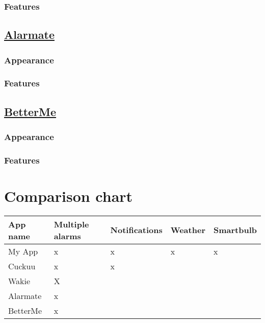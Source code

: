\subsubsection{Features}\label{features-1}

\subsection{\texorpdfstring{\href{http://applits.com/livepages/Alarmate.php}{Alarmate}}{Alarmate}}\label{alarmate}

\subsubsection{Appearance}\label{appearance-2}

\subsubsection{Features}\label{features-2}

\subsection{\texorpdfstring{\href{http://www.bettermeapp.co/}{BetterMe}}{BetterMe}}\label{betterme}

\subsubsection{Appearance}\label{appearance-3}

\subsubsection{Features}\label{features-3}

\section{Comparison chart}\label{comparison-chart}

\begin{longtable}[]{@{}lllll@{}}
\toprule
App name & Multiple alarms & Notifications & Weather &
Smartbulb\tabularnewline
\midrule
\endhead
My App & x & x & x & x\tabularnewline
Cuckuu & x & x & &\tabularnewline
Wakie & X & & &\tabularnewline
Alarmate & x & & &\tabularnewline
BetterMe & x & & &\tabularnewline
\bottomrule
\end{longtable}
